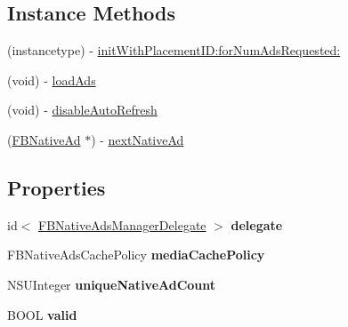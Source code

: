 \subsection*{Instance Methods}
\begin{DoxyCompactItemize}
\item 
(instancetype) -\/ \hyperlink{interface_f_b_native_ads_manager_a51a39ca77501207f156bd9f6af74c0cb}{init\-With\-Placement\-I\-D\-:for\-Num\-Ads\-Requested\-:}
\item 
(void) -\/ \hyperlink{interface_f_b_native_ads_manager_a13cbdfd0780ab23973c12854d8f60ed0}{load\-Ads}
\item 
(void) -\/ \hyperlink{interface_f_b_native_ads_manager_a1115556ad57b2876047b54ffac41e42d}{disable\-Auto\-Refresh}
\item 
(\hyperlink{interface_f_b_native_ad}{F\-B\-Native\-Ad} $\ast$) -\/ \hyperlink{interface_f_b_native_ads_manager_ab78e69cc265c33726e700431f8715de5}{next\-Native\-Ad}
\end{DoxyCompactItemize}
\subsection*{Properties}
\begin{DoxyCompactItemize}
\item 
\hypertarget{interface_f_b_native_ads_manager_a9625b6bb0a8c141b47c56ef491d6c3a4}{id$<$ \hyperlink{protocol_f_b_native_ads_manager_delegate-p}{F\-B\-Native\-Ads\-Manager\-Delegate} $>$ {\bfseries delegate}}\label{interface_f_b_native_ads_manager_a9625b6bb0a8c141b47c56ef491d6c3a4}

\item 
\hypertarget{interface_f_b_native_ads_manager_a2da7933d3447b600b50bc9187188eea0}{F\-B\-Native\-Ads\-Cache\-Policy {\bfseries media\-Cache\-Policy}}\label{interface_f_b_native_ads_manager_a2da7933d3447b600b50bc9187188eea0}

\item 
\hypertarget{interface_f_b_native_ads_manager_aad0ce28d953413365f18410d102ea13b}{N\-S\-U\-Integer {\bfseries unique\-Native\-Ad\-Count}}\label{interface_f_b_native_ads_manager_aad0ce28d953413365f18410d102ea13b}

\item 
\hypertarget{interface_f_b_native_ads_manager_ab8297d57306a41eba6086c25fc8ac2a3}{B\-O\-O\-L {\bfseries valid}}\label{interface_f_b_native_ads_manager_ab8297d57306a41eba6086c25fc8ac2a3}

\end{DoxyCompactItemize}


